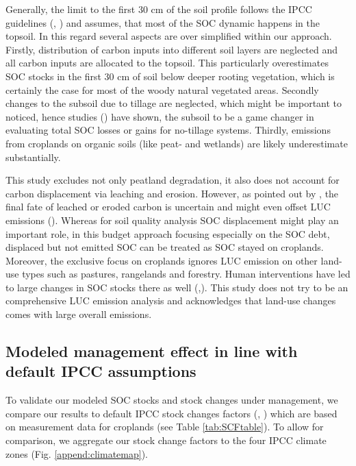 \documentclass[gc, manuscript]{copernicus}
\begin{document}
Generally, the limit to the first 30 cm of the soil profile follows the IPCC guidelines (\citep{eggleston_hs_ipcc_2006}, \citep{calvo_buendia_ipcc_2019}) and assumes, that most of the SOC dynamic happens in the topsoil. In this regard several aspects are over simplified within our approach. Firstly, distribution of carbon inputs into different soil layers are neglected and all carbon inputs are allocated to the topsoil. This particularly overestimates SOC stocks in the first 30 cm of soil below deeper rooting vegetation, which is certainly the case for most of the woody natural vegetated areas. Secondly changes to the subsoil due to tillage are neglected, which might be important to noticed, hence studies (\citep{powlson_limited_2014}) have shown, the subsoil to be a game changer in evaluating total SOC losses or gains for no-tillage systems. Thirdly, emissions from croplands on organic soils (like peat- and wetlands) are likely underestimate substantially.

This study excludes not only peatland degradation, it also does not account for carbon displacement via leaching and erosion. However, as pointed out by \citep{doetterl_erosion_2016}, the final fate of leached or eroded carbon is uncertain and might even offset LUC emissions (\citep{wang_human-induced_2017}). Whereas for soil quality analysis SOC displacement might play an important role, in this budget approach focusing especially on the SOC debt, displaced but not emitted SOC can be treated as SOC stayed on croplands.
Moreover, the exclusive focus on croplands ignores LUC emission on other land-use types such as pastures, rangelands and forestry. Human interventions have led to large changes in SOC stocks there as well (\citep{sanderman_soil_2017},\citep{friedlingstein_global_2019}). This study does not try to be an comprehensive LUC emission analysis and acknowledges that land-use changes comes with large overall emissions.

\hypertarget{sec:ipcccompare}{%
\subsection{Modeled management effect in line with default IPCC assumptions}\label{sec:ipcccompare}}

To validate our modeled SOC stocks and stock changes under management, we compare our results to default IPCC stock changes factors (\citep{eggleston_hs_ipcc_2006}, \citep{calvo_buendia_ipcc_2019}) which are based on measurement data for croplands (see Table \ref{tab:SCFtable}). To allow for comparison, we aggregate our stock change factors to the four IPCC climate zones (Fig. \ref{append:climatemap}).
\end{document}
